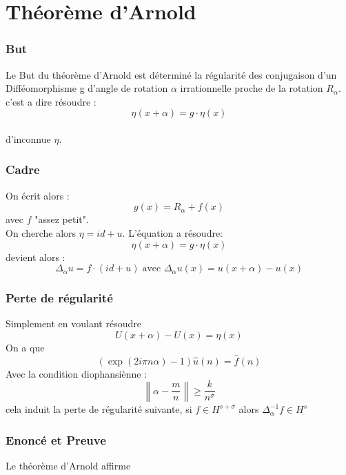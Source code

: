 \documentclass[10pt]{beamer}
\begin{document}
\section{Théorème d'Arnold}
\begin{frame}
\frametitle{But}
Le But du théorème d'Arnold est déterminé la régularité des conjugaison d'un Difféomorphisme g d'angle de rotation $\alpha$ irrationnelle proche de la rotation $R_\alpha$. c'est a dire résoudre :
$$\eta(x + \alpha)= g \cdot \eta(x)$$
\\
d'inconnue $\eta$.
\end{frame}
\begin{frame}
\frametitle{Cadre}
On écrit alors :
\[ g(x) = R_\alpha + f(x) \]
avec $f$ "assez petit". \\
On cherche alors $\eta= id + u $. 
L'équation a résoudre:
$$\eta(x + \alpha)= g \cdot \eta(x)$$
devient alors : 
$$ \Delta_\alpha u= f \cdot (id +u)  \; \text{avec  } \Delta_\alpha u(x)= u(x+\alpha) - u(x)$$

\end{frame}

\begin{frame}
\frametitle{Perte de régularité}
Simplement en voulant résoudre
$$ U(x+ \alpha) - U(x) = \eta (x) $$
On a que 
\[ (\exp(2 i \pi n \alpha)-1)\widehat{u} (n) = \widehat{f} (n) \]
Avec la condition diophansiènne :
$$ \left\| \alpha - \frac{m}{n} \right\| \geq \frac{k}{n^\sigma}$$
cela induit la perte de régularité suivante, si $f \in H^{s+\sigma}$ alors $\Delta_\alpha^{-1}f \in H^{s}$


\end{frame}


\begin{frame}
\frametitle{Enoncé et Preuve}
Le théorème d'Arnold affirme 
\end{frame}
\end{document}
